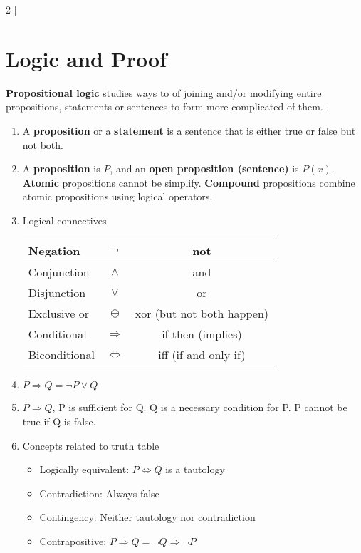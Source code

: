 \documentclass[]{article}
\begin{document}
\begin{multicols}{2}
[
\section{Logic and Proof}
\textbf{Propositional logic} studies ways to of joining and/or modifying entire propositions, statements or sentences to form more complicated of them.
]

\begin{enumerate}
  \item A \textbf{proposition} or a \textbf{statement} is a sentence that is either true or false but not both.
  \item A \textbf{proposition} is $ P $, and an \textbf{open proposition (sentence)} is $P(x)$. \textbf{Atomic} propositions cannot be simplify. \textbf{Compound} propositions combine atomic propositions using logical operators.
  \item Logical connectives \\
    \begin{tabular}{|l|c|c|}
    \hline
    Negation      & $\neg$             & not                          \\ \hline
    Conjunction   & $\land$            & and                          \\ \hline
    Disjunction   & $\lor$             & or                           \\ \hline
    Exclusive or  & $\oplus$           & xor (but not both happen)    \\ \hline
    Conditional   & $\Rightarrow$      & if then (implies)            \\ \hline
    Biconditional & $\Leftrightarrow$  & iff (if and only if)         \\ \hline
    \end{tabular}
  \item $ P\Rightarrow Q = \neg P \lor Q$
  \item $ P\Rightarrow Q $, P is sufficient for Q. Q is a necessary condition for P. P cannot be true if Q is false.
  \item Concepts related to truth table
    \begin{itemize}
      \item Logically equivalent: $P \Leftrightarrow Q$ is a tautology
      \item Contradiction: Always false
      \item Contingency: Neither tautology nor contradiction
      \item Contrapositive: $P \Rightarrow Q = \neg Q \Rightarrow \neg P$

\end{itemize}
\end{enumerate}
\end{multicols}
\end{document}
